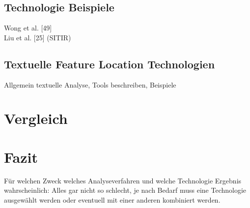 \documentclass[runningheads,a4paper]{llncs}
\begin{document}
\subsection*{Technologie Beispiele}
Wong et al. [49]\\
Liu et al. [25] (SITIR)

\subsection{Textuelle Feature Location Technologien}
Allgemein textuelle Analyse, Tools beschreiben, Beispiele

\section{Vergleich}

\section{Fazit}
Für welchen Zweck welches Analyseverfahren und welche Technologie
Ergebnis wahrscheinlich: Alles gar nicht so schlecht, je nach Bedarf muss eine Technologie ausgewählt werden oder eventuell mit einer anderen kombiniert werden.




\clearpage

\end{document}

